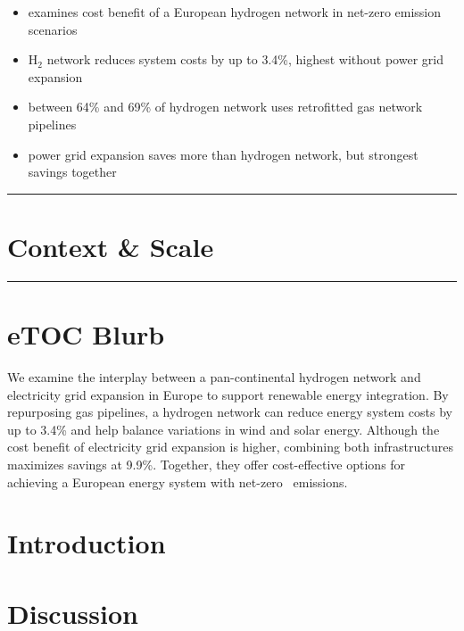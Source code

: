 \documentclass[11pt,preprint]{elsarticle}
\newcommand{\co}{\ce{CO2}~}
\begin{document}
\begin{itemize}
	\item examines cost benefit of a European hydrogen network in net-zero emission scenarios
	\item H$_2$ network reduces system costs by up to 3.4\%, highest without power grid expansion
	\item between 64\% and 69\% of hydrogen network uses retrofitted gas network pipelines
	\item power grid expansion saves more than hydrogen network, but strongest savings together
\end{itemize}

\par\noindent\rule{\textwidth}{0.4pt}

\section*{Context \& Scale}



\par\noindent\rule{\textwidth}{0.4pt}

\section*{eTOC Blurb}

We examine the interplay between a pan-continental hydrogen network and
electricity grid expansion in Europe to support renewable energy integration. By
repurposing gas pipelines, a hydrogen network can reduce energy system costs by
up to 3.4\% and help balance variations in wind and solar energy. Although the
cost benefit of electricity grid expansion is higher, combining both
infrastructures maximizes savings at 9.9\%. Together, they offer cost-effective
options for achieving a European energy system with net-zero \co emissions.

\newpage
\section*{Introduction}
\label{sec:intro}






\section*{Discussion}
\label{sec:discussion}
\end{document}
